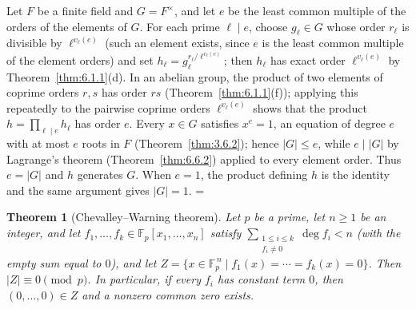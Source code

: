 \documentclass[11pt]{article}
\makeatletter
\theoremstyle{ntstyle}
\newtheorem{theorem}{Theorem}[subsection]
\let\nt@closedisplay\]
\def\nt@guardedclose{\@ifnextchar\par{\nt@closeafterpar}{\@ifnextchar\end{\postdisplaypenalty\@M\nt@closedisplay}{\nt@closedisplay}}}
\def\nt@closeafterpar\par{\@ifnextchar\par{\nt@closeafterpar}{\@ifnextchar\end{\postdisplaypenalty\@M\nt@closedisplay\par}{\nt@closedisplay\par}}}
\renewenvironment{proof}[1][\proofname]{\par
  \pushQED{\qed}\normalfont\topsep\medskipamount\edef\nt@afterproof{\@endparpenalty=\the\@endparpenalty\relax}\@beginparpenalty\@M\@endparpenalty\@M\let\]\nt@guardedclose\trivlist\item[]\textit{#1\@addpunct{.}} \ignorespaces}{\ifvmode\addpenalty\@M\fi\popQED\nt@afterproof\endtrivlist\@endpefalse}
\makeatother
\begin{document}
\begin{proof} Let $F$ be a finite field and $G=F^{\times}$, and let
	$e$ be the least common multiple of the orders of the elements of $G$. For
	each prime $\ell\mid e$, choose $g_\ell\in G$ whose order $r_\ell$ is
	divisible by $\ell^{v_\ell(e)}$ (such an element exists, since $e$ is the least
	common multiple of the element orders) and set
	$h_\ell=g_\ell^{r_\ell/\ell^{v_\ell(e)}}$; then $h_\ell$ has exact order
	$\ell^{v_\ell(e)}$ by Theorem~\ref{thm:6.1.1}(d). In an abelian group, the
	product of two elements of coprime orders $r,s$ has order $rs$
	(Theorem~\ref{thm:6.1.1}(f)); applying this repeatedly to the pairwise coprime orders
	$\ell^{v_\ell(e)}$ shows that the product $h=\prod_{\ell\mid e}h_\ell$ has order $e$.
	Every $x\in G$ satisfies $x^{e}=1$, an equation of degree $e$ with at most
	$e$ roots in $F$ (Theorem~\ref{thm:3.6.2}); hence $|G|\le e$, while
	$e\mid|G|$ by Lagrange's theorem (Theorem~\ref{thm:6.6.2}) applied to every element order. Thus
	$e=|G|$ and $h$ generates $G$. When $e=1$, the product defining $h$ is the identity and the same
	argument gives $|G|=1$.
\end{proof}
\begin{theorem}[Chevalley--Warning theorem]\label{thm:6.10.2} Let $p$ be a prime,
	let $n\ge1$ be an integer, and let $f_1,
		\ldots, f_k \in \mathbb{F}_p[x_1, \ldots, x_n]$ satisfy
	$\sum_{\substack{1\le i\le k\\ f_i\neq0}} \deg f_i < n$ (with the
	empty sum equal to $0$), and let $Z = \{x \in
		\mathbb{F}_p^{\,n} \mid f_1(x) = \cdots = f_k(x) = 0\}$. Then $|Z|
		\equiv 0 \pmod{p}$. In particular, if every $f_i$ has constant term $0$, then $(0,\ldots,0)\in Z$
		and a nonzero common zero exists.
\end{theorem}
\end{document}
